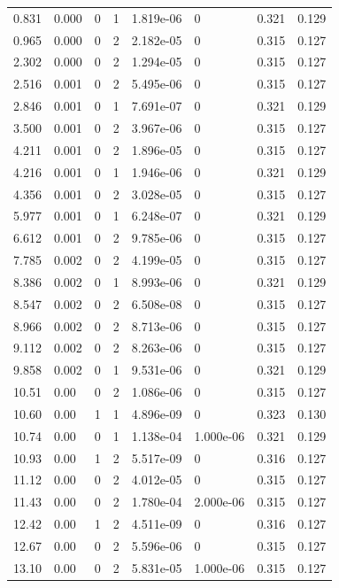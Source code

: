 \documentclass[preview]{standalone}
\begin{document}
{{\begin{tabular}{L{1.2cm}C{1.2cm} C{0.3cm}C{0.5cm} C{1.4cm}C{1.4cm} C{1.4cm}C{1.4cm}}
  0.831  &  0.000  & 0     &  1 &  1.819e-06  & 0  & 0.321 &  0.129   \\ 
  0.965  &  0.000  & 0     &  2 &  2.182e-05  & 0  & 0.315 &  0.127   \\ 
  2.302  &  0.000  & 0     &  2 &  1.294e-05  & 0  & 0.315 &  0.127   \\ 
  2.516  &  0.001  & 0     &  2 &  5.495e-06  & 0  & 0.315 &  0.127   \\ 
  2.846  &  0.001  & 0     &  1 &  7.691e-07  & 0  & 0.321 &  0.129   \\ 
  3.500  &  0.001  & 0     &  2 &  3.967e-06  & 0  & 0.315 &  0.127   \\ 
  4.211  &  0.001  & 0     &  2 &  1.896e-05  & 0  & 0.315 &  0.127   \\ 
  4.216  &  0.001  & 0     &  1 &  1.946e-06  & 0  & 0.321 &  0.129   \\ 
  4.356  &  0.001  & 0     &  2 &  3.028e-05  & 0  & 0.315 &  0.127   \\ 
  5.977  &  0.001  & 0     &  1 &  6.248e-07  & 0  & 0.321 &  0.129   \\ 
  6.612  &  0.001  & 0     &  2 &  9.785e-06  & 0  & 0.315 &  0.127   \\ 
  7.785  &  0.002  & 0     &  2 &  4.199e-05  & 0  & 0.315 &  0.127   \\ 
  8.386  &  0.002  & 0     &  1 &  8.993e-06  & 0  & 0.321 &  0.129   \\ 
  8.547  &  0.002  & 0     &  2 &  6.508e-08  & 0  & 0.315 &  0.127   \\ 
  8.966  &  0.002  & 0     &  2 &  8.713e-06  & 0  & 0.315 &  0.127   \\ 
  9.112  &  0.002  & 0     &  2 &  8.263e-06  & 0  & 0.315 &  0.127   \\ 
  9.858  &  0.002  & 0     &  1 &  9.531e-06  & 0  & 0.321 &  0.129   \\ 
  10.51  &  0.00  & 0     &  2 &  1.086e-06  & 0  & 0.315 &  0.127   \\ 
  10.60  &  0.00  & 1     &  1 &  4.896e-09  & 0  & 0.323 &  0.130   \\ 
  10.74  &  0.00  & 0     &  1 &  1.138e-04  & 1.000e-06  & 0.321 &  0.129   \\ 
  10.93  &  0.00  & 1     &  2 &  5.517e-09  & 0  & 0.316 &  0.127   \\ 
  11.12  &  0.00  & 0     &  2 &  4.012e-05  & 0  & 0.315 &  0.127   \\ 
  11.43  &  0.00  & 0     &  2 &  1.780e-04  & 2.000e-06  & 0.315 &  0.127   \\ 
  12.42  &  0.00  & 1     &  2 &  4.511e-09  & 0  & 0.316 &  0.127   \\ 
  12.67  &  0.00  & 0     &  2 &  5.596e-06  & 0  & 0.315 &  0.127   \\ 
  13.10  &  0.00  & 0     &  2 &  5.831e-05  & 1.000e-06  & 0.315 &  0.127   \\ 
\hline 
\end{tabular} 

}}
\end{document}
